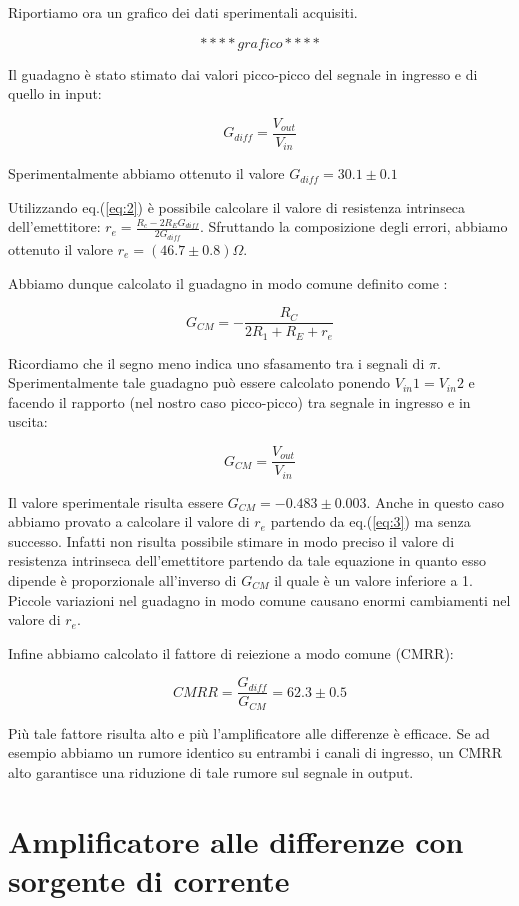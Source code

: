 Riportiamo ora un grafico dei dati sperimentali acquisiti. 

$$****grafico****$$


Il guadagno è stato stimato dai valori picco-picco del segnale in ingresso e di quello in input:

$$G_{diff}=\frac{V_{out}}{V_{in}}$$

Sperimentalmente abbiamo ottenuto il valore $G_{diff}=30.1 \pm 0.1$


Utilizzando eq.(\ref{eq:2}) è possibile calcolare il valore di resistenza intrinseca dell'emettitore: $r_e=\frac{R_c-2R_E G_{diff}}{2G_{diff}}$.
Sfruttando la composizione degli errori, abbiamo ottenuto il valore $r_e=(46.7\pm0.8)\Omega$.

Abbiamo dunque calcolato il guadagno in modo comune definito come :

\begin{equation}
G_{CM}=-\frac{R_C}{2R_1+R_E+	r_e}
\label{eq:3}
\end{equation}

Ricordiamo che il segno meno indica uno sfasamento tra i segnali di $\pi$.
Sperimentalmente tale guadagno può essere calcolato ponendo $V_{in}1=V_{in}2$ e facendo il rapporto (nel nostro caso picco-picco) tra segnale in ingresso e in uscita:

$$G_{CM}=\frac{V_{out}}{V_{in}}$$

Il valore sperimentale risulta essere $G_{CM}=-0.483\pm0.003$. Anche in questo caso abbiamo provato a calcolare il valore di $r_e$ partendo da eq.(\ref{eq:3}) ma senza successo. Infatti non risulta possibile stimare in modo preciso il valore di resistenza intrinseca dell'emettitore partendo da tale equazione in quanto esso dipende è proporzionale all'inverso di $G_{CM}$ il quale è un valore inferiore a 1. Piccole variazioni nel guadagno in modo comune causano enormi cambiamenti nel valore di $r_e$. 

Infine abbiamo calcolato il fattore di reiezione a modo comune (CMRR):

\begin{equation}
CMRR=\frac{G_{diff}}{G_{CM}}=62.3\pm0.5
\end{equation}

Più tale fattore risulta alto e più l'amplificatore alle differenze è efficace. Se ad esempio abbiamo un rumore identico su entrambi i canali di ingresso, un CMRR alto garantisce una riduzione di tale rumore sul segnale in output.

\section{Amplificatore alle differenze con sorgente di corrente}